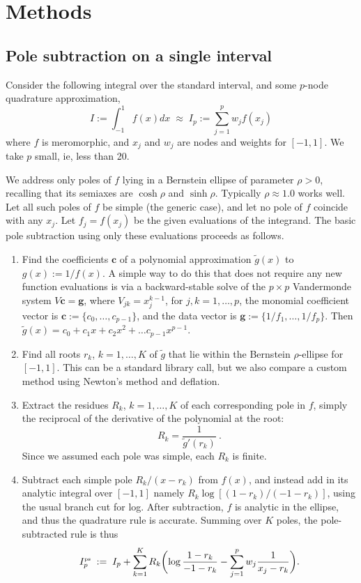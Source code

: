 \documentclass[11pt]{article}
\newcommand{\ben}{\begin{enumerate}}
\newcommand{\een}{\end{enumerate}}
\newcommand{\be}{\begin{equation}}
\newcommand{\ee}{\end{equation}}
\newcommand{\tbox}[1]{{\mbox{\tiny #1}}}
\newcommand{\mbf}[1]{{\mathbf #1}}
\begin{document}
\section{Methods}
\subsection{Pole subtraction on a single interval}

Consider the following integral over the standard interval,
and some $p$-node quadrature approximation,
\be
I := \int_{-1}^1 f(x) dx
\;\approx\;
I_p := \sum_{j=1}^p w_j f(x_j)
\label{I}
\ee
where $f$ is meromorphic, and $x_j$ and $w_j$ are nodes and weights for $[-1,1]$.
We take $p$ small, ie, less than 20.

We address only poles of $f$ lying in a Bernstein ellipse of parameter $\rho>0$,
recalling that its
semiaxes are $\cosh\rho$ and $\sinh\rho$.
Typically $\rho \approx 1.0$ works well.
Let all such poles of $f$ be simple (the generic case),
and let no pole of $f$ coincide with any $x_j$.
Let $f_j = f(x_j)$ be the given evaluations of the integrand.
The basic pole subtraction using only these evaluations proceeds as follows.
\ben
\item Find the coefficients $\mbf{c}$
  of a polynomial approximation $\tilde g(x)$ to $g(x) := 1/f(x)$.
  A simple way to do this that does not require any new function evaluations
  is via a backward-stable solve of the
  $p\times p$ Vandermonde system $V\mbf{c} = \mbf{g}$, where
  $V_{jk} = x_j^{k-1}$, for $j,k = 1,\dots,p$,
  the monomial coefficient vector is $\mbf{c} := \{c_0,\dots,c_{p-1}\}$,
  and the data vector is $\mbf{g} := \{1/f_1,\dots,1/f_p\}$.
  Then $\tilde g(x) = c_0 + c_1x + c_2 x^2 + \dots c_{p-1}x^{p-1}$.
\item
  Find all roots $r_k$, $k=1,\dots,K$
  of $\tilde g$ that lie within the Bernstein $\rho$-ellipse for $[-1,1]$.
  This can be a standard library call, but we also compare a custom method
  using Newton's method and deflation.
\item
  Extract the residues $R_k$, $k=1,\dots,K$ of each corresponding pole in $f$,
  simply the reciprocal of the derivative of the polynomial at the root:
  \be
  R_k = \frac{1}{\tilde g'(r_k)}~.
  \ee
  Since we assumed each pole was simple, each $R_k$ is finite.
\item Subtract each simple pole $R_k/(x-r_k)$ from $f(x)$, and instead
  add in its analytic integral over $[-1,1]$ namely $R_k \log[(1-r_k)/(-1-r_k)]$,
  using the usual branch cut for log.
  After subtraction, $f$ is analytic in the ellipse, and thus the quadrature
  rule is accurate.
  Summing over $K$ poles, the pole-subtracted rule is thus
  \be
  I^{\tbox{ps}}_p \;:=\;
  I_p +
  \sum_{k=1}^K R_k \biggl(
  \log\frac{1-r_k}{-1-r_k} -
  \sum_{j=1}^p w_j \frac{1}{x_j - r_k}
  \biggr).
  \label{ps}
  \ee
\een
\end{document}
